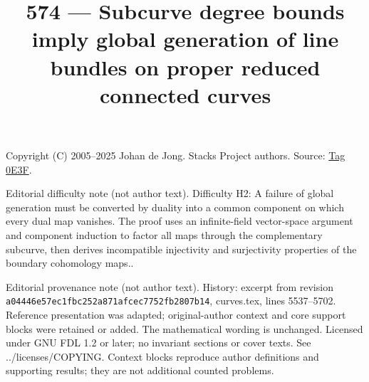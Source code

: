 \documentclass{amsart}
\theoremstyle{plain}
\theoremstyle{definition}
\theoremstyle{remark}
\numberwithin{equation}{subsection}
\begin{document}
\title[Stacks Project, Tag 0E3F]{574 --- Subcurve degree bounds imply global generation of line bundles on proper reduced connected curves}
\maketitle
\noindent Copyright (C) 2005--2025 Johan de Jong. Stacks Project authors. Source: \href{https://stacks.math.columbia.edu/tag/0E3F}{Tag 0E3F}.

\noindent Editorial difficulty note (not author text). Difficulty H2: A failure of global generation must be converted by duality into a common component on which every dual map vanishes. The proof uses an infinite-field vector-space argument and component induction to factor all maps through the complementary subcurve, then derives incompatible injectivity and surjectivity properties of the boundary cohomology maps..

\noindent Editorial provenance note (not author text). History: excerpt from revision \texttt{a0444\allowbreak 6e57e\allowbreak c1fbc\allowbreak 252a8\allowbreak 71afc\allowbreak ec775\allowbreak 2fb28\allowbreak 07b14}, curves.tex, lines 5537--5702. Reference presentation was adapted; original-author context and core support blocks were retained or added. The mathematical wording is unchanged. Licensed under GNU FDL 1.2 or later; no invariant sections or cover texts. See ../licenses/COPYING. Context blocks reproduce author definitions and supporting results; they are not additional counted problems.
\end{document}
